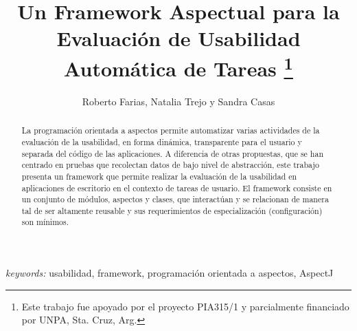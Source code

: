 \documentclass{llncs}
\begin{document}

\title{Un Framework Aspectual para la Evaluación de Usabilidad Automática de Tareas
\thanks{Este trabajo fue apoyado por el proyecto PIA315/1 y parcialmente financiado por UNPA, Sta. Cruz, Arg.}}


\author{
Roberto Farias, 
 Natalia Trejo y
 Sandra Casas    
}







\maketitle


\begin{abstract}
La programación orientada a aspectos permite automatizar varias actividades de la evaluación de la usabilidad, en forma dinámica, transparente para el usuario y separada del código de las aplicaciones. A diferencia de otras propuestas, que se han centrado en pruebas que recolectan datos de bajo nivel de abstracción, este trabajo presenta un framework que permite realizar la evaluación de la usabilidad en aplicaciones de escritorio en el contexto de tareas de usuario. El framework consiste en un conjunto de módulos, aspectos y clases, que interactúan y se relacionan de manera tal de ser altamente reusable y sus requerimientos de especialización (configuración) son mínimos. 
\end{abstract}
{\em keywords:} usabilidad, framework, programación orientada a aspectos, AspectJ















\end{document}
